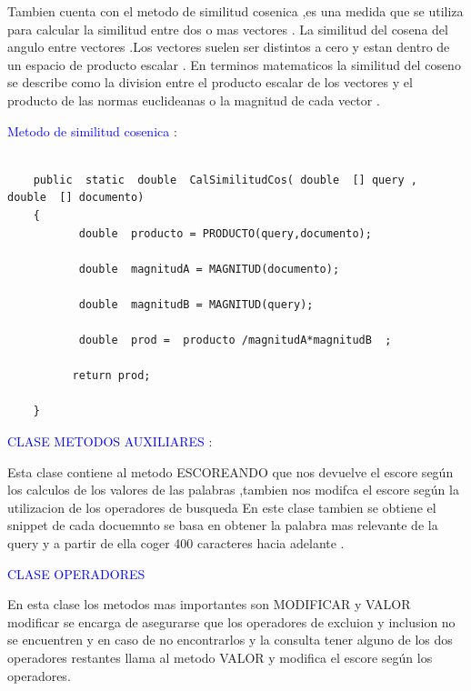 \documentclass{article}
\begin{document}
\vspace{0.2cm}

Tambien cuenta con el metodo de similitud cosenica ,es una medida que se utiliza para calcular la similitud entre dos o mas vectores . La similitud del cosena del angulo entre vectores .Los vectores suelen ser distintos a cero y estan dentro de un espacio de producto escalar .
En terminos matematicos la similitud del coseno se describe como la division entre el producto escalar de los vectores y el producto de las normas euclideanas o la magnitud de cada vector .

\vspace{0.2cm}
\textcolor{blue}{ Metodo de similitud cosenica }:
\small
\begin{lstlisting}
    
    public  static  double  CalSimilitudCos( double  [] query ,  double  [] documento)
    {
           double  producto = PRODUCTO(query,documento);
          
           double  magnitudA = MAGNITUD(documento);
          
           double  magnitudB = MAGNITUD(query);
        
           double  prod =  producto /magnitudA*magnitudB  ;
          
          return prod;
  
    }
\end{lstlisting}

\large \textcolor {blue}{CLASE METODOS AUXILIARES} :

\vspace{0.2cm}

Esta clase contiene al metodo ESCOREANDO que nos devuelve el escore según los calculos de los valores de las palabras ,tambien nos modifca el escore según la utilizacion de los operadores de busqueda
En este clase  tambien se obtiene el snippet de cada docuemnto se basa en obtener la palabra mas relevante de la query y a partir de ella coger 400 caracteres hacia adelante .

\vspace{0.5cm}

\large\textcolor {blue} {CLASE OPERADORES}

\vspace{0.2cm}

En esta clase los metodos mas importantes son MODIFICAR y VALOR modificar se encarga de asegurarse que los operadores de excluion y inclusion no se encuentren y en caso de no encontrarlos y la consulta tener alguno de los dos operadores restantes llama al metodo VALOR y modifica el escore según los operadores.
\end{document}
